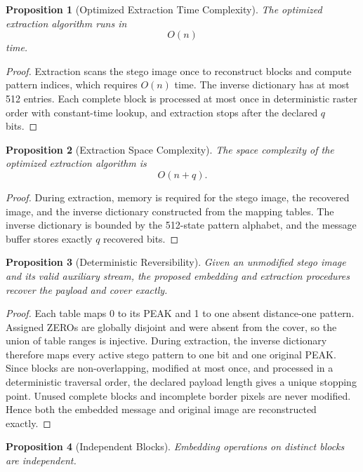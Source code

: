 \documentclass[a4paper,fleqn]{cas-dc}
\newtheorem{proposition}{Proposition}[section]
\begin{document}
\begin{proposition}[Optimized Extraction Time Complexity]
The optimized extraction algorithm runs in
\[
O(n)
\]
time.
\end{proposition}

\begin{proof}
Extraction scans the stego image once to reconstruct blocks and compute pattern
indices, which requires $O(n)$ time.
The inverse dictionary has at most 512 entries. Each complete block is
processed at most once in deterministic raster order with constant-time
lookup, and extraction stops after the declared $q$ bits.
\end{proof}

\begin{proposition}[Extraction Space Complexity]
The space complexity of the optimized extraction algorithm is
\[
O(n+q).
\]
\end{proposition}

\begin{proof}
During extraction, memory is required for the stego image, the recovered image,
and the inverse dictionary constructed from the mapping tables.
The inverse dictionary is bounded by the 512-state pattern alphabet, and the
message buffer stores exactly $q$ recovered bits.
\end{proof}

\begin{proposition}[Deterministic Reversibility]
Given an unmodified stego image and its valid auxiliary stream, the proposed
embedding and extraction procedures recover the payload and cover exactly.
\end{proposition}

\begin{proof}
Each table maps 0 to its PEAK and 1 to one absent distance-one pattern.
Assigned ZEROs are globally disjoint and were absent from the cover, so the
union of table ranges is injective. During extraction, the inverse dictionary
therefore maps every active stego pattern to one bit and one original PEAK.
Since blocks are non-overlapping, modified at most once, and processed in a
deterministic traversal order, the declared payload length gives a unique
stopping point. Unused complete blocks and incomplete border pixels are never
modified. Hence both the embedded message and original image are reconstructed
exactly.
\end{proof}

\begin{proposition}[Independent Blocks]
Embedding operations on distinct blocks are independent.
\end{proposition}
\end{document}

